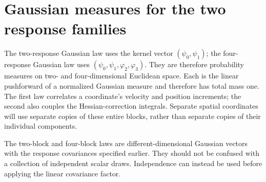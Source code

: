 \documentclass[11pt,a4paper]{article}
\begin{document}
\section{\texorpdfstring{Gaussian measures for the two response families}{Gaussian measures for the two response families}}


The two-response Gaussian law uses the kernel vector \((\psi_0,\psi_1)\); the four-response Gaussian law uses \((\psi_0,\psi_1,\varphi_2,\varphi_3)\). They are therefore probability measures on two- and four-dimensional Euclidean space. Each is the linear pushforward of a normalized Gaussian measure and therefore has total mass one. The first law correlates a coordinate's velocity and position increments; the second also couples the Hessian-correction integrals. Separate spatial coordinates will use separate copies of these entire blocks, rather than separate copies of their individual components.



The two-block and four-block laws are different-dimensional Gaussian vectors with the response covariances specified earlier. They should not be confused with a collection of independent scalar draws. Independence can instead be used before applying the linear covariance factor.
\end{document}
